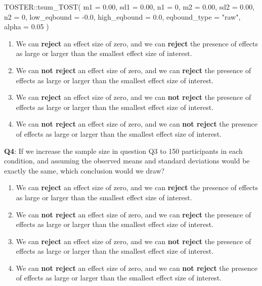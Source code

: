 \documentclass[
  oneside]{krantz}
\makeatletter
\newenvironment{Shaded}{\begin{snugshade}}{\end{snugshade}}
\newcommand{\AttributeTok}[1]{\textcolor[rgb]{0.61,0.61,0.61}{#1}}
\newcommand{\DecValTok}[1]{\textcolor[rgb]{0.06,0.06,0.06}{#1}}
\newcommand{\FloatTok}[1]{\textcolor[rgb]{0.06,0.06,0.06}{#1}}
\newcommand{\FunctionTok}[1]{\textcolor[rgb]{0,0,0}{#1}}
\newcommand{\NormalTok}[1]{#1}
\newcommand{\SpecialCharTok}[1]{\textcolor[rgb]{0,0,0}{#1}}
\newcommand{\StringTok}[1]{\textcolor[rgb]{0.5,0.5,0.5}{#1}}
\providecommand{\tightlist}{%
  \setlength{\itemsep}{0pt}\setlength{\parskip}{0pt}}
\newenvironment{kframe}{%
\medskip{}
\setlength{\fboxsep}{.8em}
 \def\at@end@of@kframe{}%
 \ifinner\ifhmode%
  \def\at@end@of@kframe{\end{minipage}}%
  \begin{minipage}{\columnwidth}%
 \fi\fi%
 \def\FrameCommand##1{\hskip\@totalleftmargin \hskip-\fboxsep
 \colorbox{shadecolor}{##1}\hskip-\fboxsep
     \hskip-\linewidth \hskip-\@totalleftmargin \hskip\columnwidth}%
 \MakeFramed {\advance\hsize-\width
   \@totalleftmargin\z@ \linewidth\hsize
   \@setminipage}}%
 {\par\unskip\endMakeFramed%
 \at@end@of@kframe}
\renewenvironment{Shaded}{\begin{kframe}}{\end{kframe}}
\makeatother
\begin{document}
\begin{Shaded}
\begin{Highlighting}[]
\NormalTok{TOSTER}\SpecialCharTok{::}\FunctionTok{tsum\_TOST}\NormalTok{(}
  \AttributeTok{m1 =} \FloatTok{0.00}\NormalTok{,}
  \AttributeTok{sd1 =} \FloatTok{0.00}\NormalTok{,}
  \AttributeTok{n1 =} \DecValTok{0}\NormalTok{,}
  \AttributeTok{m2 =} \FloatTok{0.00}\NormalTok{,}
  \AttributeTok{sd2 =} \FloatTok{0.00}\NormalTok{,}
  \AttributeTok{n2 =} \DecValTok{0}\NormalTok{,}
  \AttributeTok{low\_eqbound =} \SpecialCharTok{{-}}\FloatTok{0.0}\NormalTok{,}
  \AttributeTok{high\_eqbound =} \FloatTok{0.0}\NormalTok{,}
  \AttributeTok{eqbound\_type =} \StringTok{"raw"}\NormalTok{,}
  \AttributeTok{alpha =} \FloatTok{0.05}
\NormalTok{)}
\end{Highlighting}
\end{Shaded}

\begin{enumerate}
\def\labelenumi{\Alph{enumi})}
\tightlist
\item
  We can \textbf{reject} an effect size of zero, and we can \textbf{reject} the presence of effects as large or larger than the smallest effect size of interest.
\item
  We can \textbf{not reject} an effect size of zero, and we can \textbf{reject} the presence of effects as large or larger than the smallest effect size of interest.
\item
  We can \textbf{reject} an effect size of zero, and we can \textbf{not reject} the presence of effects as large or larger than the smallest effect size of interest.
\item
  We can \textbf{not reject} an effect size of zero, and we can \textbf{not reject} the presence of effects as large or larger than the smallest effect size of interest.
\end{enumerate}

\textbf{Q4}: If we increase the sample size in question Q3 to 150 participants in each condition, and assuming the observed means and standard deviations would be exactly the same, which conclusion would we draw?

\begin{enumerate}
\def\labelenumi{\Alph{enumi})}
\tightlist
\item
  We can \textbf{reject} an effect size of zero, and we can \textbf{reject} the presence of effects as large or larger than the smallest effect size of interest.
\item
  We can \textbf{not reject} an effect size of zero, and we can \textbf{reject} the presence of effects as large or larger than the smallest effect size of interest.
\item
  We can \textbf{reject} an effect size of zero, and we can \textbf{not reject} the presence of effects as large or larger than the smallest effect size of interest.
\item
  We can \textbf{not reject} an effect size of zero, and we can \textbf{not reject} the presence of effects as large or larger than the smallest effect size of interest.
\end{enumerate}
\end{document}
